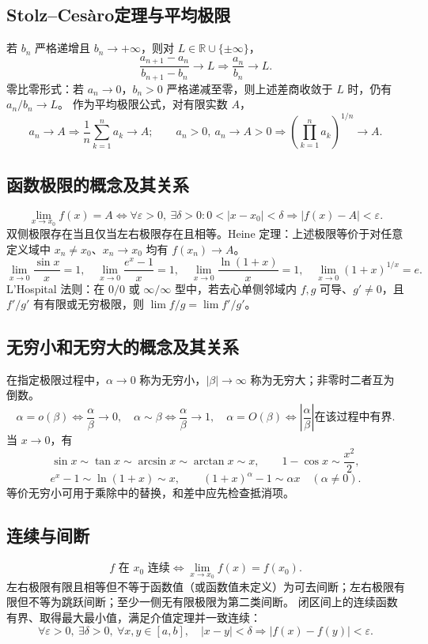 \documentclass[../main.tex]{subfiles}
\begin{document}
\subsection{Stolz--Ces\`aro定理与平均极限}
若 $b_n$ 严格递增且 $b_n\to+\infty$，则对 $L\in\mathbb R\cup\{\pm\infty\}$，
\[
\frac{a_{n+1}-a_n}{b_{n+1}-b_n}\to L
\Longrightarrow\frac{a_n}{b_n}\to L.
\]
零比零形式：若 $a_n\to0$，$b_n>0$ 严格递减至零，则上述差商收敛于 $L$ 时，仍有 $a_n/b_n\to L$。
作为平均极限公式，对有限实数 $A$，
\[
a_n\to A\Longrightarrow
\frac1n\sum_{k=1}^n a_k\to A;
\qquad
a_n>0,\ a_n\to A>0\Longrightarrow
\left(\prod_{k=1}^na_k\right)^{1/n}\to A.
\]
\subsection{函数极限的概念及其关系}
\[
\lim_{x\to x_0}f(x)=A\iff\forall\varepsilon>0,\ \exists\delta>0:
0<|x-x_0|<\delta\Longrightarrow |f(x)-A|<\varepsilon.
\]
双侧极限存在当且仅当左右极限存在且相等。Heine 定理：上述极限等价于对任意定义域中 $x_n\ne x_0$、$x_n\to x_0$ 均有 $f(x_n)\to A$。
\[
\lim_{x\to0}\frac{\sin x}{x}=1,\quad
\lim_{x\to0}\frac{e^x-1}{x}=1,\quad
\lim_{x\to0}\frac{\ln(1+x)}x=1,\quad
\lim_{x\to0}(1+x)^{1/x}=e.
\]
L'Hospital 法则：在 $0/0$ 或 $\infty/\infty$ 型中，若去心单侧邻域内 $f,g$ 可导、$g'\ne0$，且 $f'/g'$ 有有限或无穷极限，则 $\lim f/g=\lim f'/g'$。
\subsection{无穷小和无穷大的概念及其关系}
在指定极限过程中，$\alpha\to0$ 称为无穷小，$|\beta|\to\infty$ 称为无穷大；非零时二者互为倒数。
\[
\alpha=o(\beta)\iff\frac\alpha\beta\to0,\quad
\alpha\sim\beta\iff\frac\alpha\beta\to1,\quad
\alpha=O(\beta)\iff\left|\frac\alpha\beta\right|\text{在该过程中有界}.
\]
当 $x\to0$，有
\[
\sin x\sim\tan x\sim\arcsin x\sim\arctan x\sim x,\qquad
1-\cos x\sim\frac{x^2}2,
\]
\[
e^x-1\sim\ln(1+x)\sim x,\qquad (1+x)^\alpha-1\sim\alpha x\quad(\alpha\ne0).
\]
等价无穷小可用于乘除中的替换，和差中应先检查抵消项。
\subsection{连续与间断}
\[
f\text{ 在 }x_0\text{ 连续}\iff\lim_{x\to x_0}f(x)=f(x_0).
\]
左右极限有限且相等但不等于函数值（或函数值未定义）为可去间断；左右极限有限但不等为跳跃间断；至少一侧无有限极限为第二类间断。
闭区间上的连续函数有界、取得最大最小值，满足介值定理并一致连续：
\[
\forall\varepsilon>0,\ \exists\delta>0,\ \forall x,y\in[a,b],\quad
|x-y|<\delta\Longrightarrow |f(x)-f(y)|<\varepsilon.
\]
\end{document}
